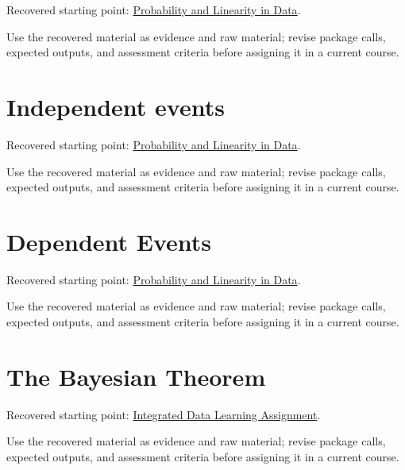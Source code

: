 \documentclass[
  letterpaper,
]{scrbook}
\begin{document}

Recovered starting point:
\hyperref[sec-lab-probability-linearity]{Probability and Linearity in
Data}.

Use the recovered material as evidence and raw material; revise package
calls, expected outputs, and assessment criteria before assigning it in
a current course.

\section*{Independent events}\label{sec-pr-04-independent-events}


Recovered starting point:
\hyperref[sec-lab-probability-linearity]{Probability and Linearity in
Data}.

Use the recovered material as evidence and raw material; revise package
calls, expected outputs, and assessment criteria before assigning it in
a current course.

\section*{Dependent Events}\label{sec-pr-04-dependent-events}


Recovered starting point:
\hyperref[sec-lab-probability-linearity]{Probability and Linearity in
Data}.

Use the recovered material as evidence and raw material; revise package
calls, expected outputs, and assessment criteria before assigning it in
a current course.

\section*{The Bayesian Theorem}\label{sec-pr-04-the-bayesian-theorem}


Recovered starting point:
\hyperref[sec-lab-integrated-learning-assignment]{Integrated Data
Learning Assignment}.

Use the recovered material as evidence and raw material; revise package
calls, expected outputs, and assessment criteria before assigning it in
a current course.
\end{document}

